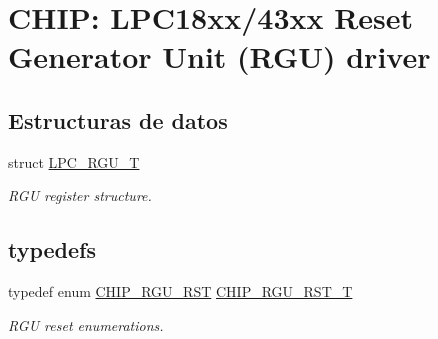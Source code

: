 \hypertarget{group___r_g_u__18_x_x__43_x_x}{}\section{C\+H\+IP\+: L\+P\+C18xx/43xx Reset Generator Unit (R\+GU) driver}
\label{group___r_g_u__18_x_x__43_x_x}
\subsection*{Estructuras de datos}
\begin{DoxyCompactItemize}
\item 
struct \hyperlink{struct_l_p_c___r_g_u___t}{L\+P\+C\+\_\+\+R\+G\+U\+\_\+T}
\begin{DoxyCompactList}\small\item\em R\+GU register structure. \end{DoxyCompactList}\end{DoxyCompactItemize}
\subsection*{\textquotesingle{}typedefs\textquotesingle{}}
\begin{DoxyCompactItemize}
\item 
typedef enum \hyperlink{group___r_g_u__18_x_x__43_x_x_gaba95b3f477c73ccfad274a65a9c97a9e}{C\+H\+I\+P\+\_\+\+R\+G\+U\+\_\+\+R\+ST} \hyperlink{group___r_g_u__18_x_x__43_x_x_gaf76b0dbb78e73bbcd44948364417ae60}{C\+H\+I\+P\+\_\+\+R\+G\+U\+\_\+\+R\+S\+T\+\_\+T}
\begin{DoxyCompactList}\small\item\em R\+GU reset enumerations. \end{DoxyCompactList}\end{DoxyCompactItemize}

